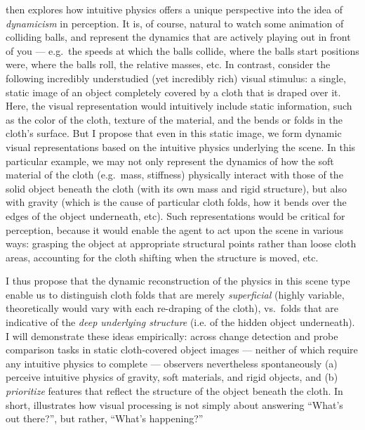  then explores how intuitive physics offers a unique perspective into the idea of \textit{dynamicism} in perception.   It is, of course, natural to watch some animation of colliding balls, and represent the dynamics that are actively playing out in front of you --- e.g.~the speeds at which the balls collide, where the balls start positions were, where the balls roll, the relative masses, etc.  In contrast, consider the following incredibly understudied (yet incredibly rich) visual stimulus: a single, static image of an object completely covered by a cloth  that is draped over it.  Here, the visual representation would intuitively include static information, such as the color of the cloth, texture of the material, and the bends or folds in the cloth's surface.  But I propose that even in this static image, we form dynamic visual representations based on the intuitive physics underlying the scene.  In this particular example, we may not only represent the dynamics of how the soft material of the cloth (e.g.~mass, stiffness) physically interact with those of the solid object beneath the cloth (with its own mass and rigid structure), but also with gravity (which is the cause of particular cloth folds, how it bends over the edges of the object underneath, etc). Such representations would be critical for perception, because it would enable the agent to act upon the scene in various ways: grasping the object at appropriate structural points rather than loose cloth areas, accounting for the cloth shifting when the structure is moved, etc.

I thus propose that the dynamic reconstruction of the physics in this scene type enable us to distinguish cloth folds that are merely \textit{superficial} (highly variable, theoretically would vary with each re-draping of the cloth), vs.~folds that are indicative of the \textit{deep underlying structure} (i.e. of the hidden object underneath).  I will demonstrate these ideas empirically: across change detection and probe comparison tasks in static cloth-covered object images --- neither of which require any intuitive physics to complete --- observers nevertheless spontaneously (a) perceive intuitive physics of gravity, soft materials, and rigid objects, and (b) \textit{prioritize} features that reflect the structure of the object beneath the cloth. In short,  illustrates how visual processing is not simply about answering “What’s out there?”, but rather, “What’s happening?”


